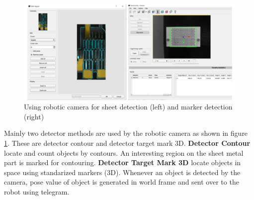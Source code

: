 \begin{figure}[h]
    \centering
    \includegraphics[width=\textwidth]{figures/robotic-detection.png}
    \caption{Using robotic camera for sheet detection (left) and marker detection (right)}
    \label{fig:robotic-detection}
\end{figure}

Mainly two detector methods are used by the robotic camera as shown in figure \ref{fig:robotic-detection}. These are detector contour and detector target mark 3D. \textbf{Detector Contour} locate and count objects by contours. An interesting region on the sheet metal part is marked for contouring. 
\textbf{Detector Target Mark 3D} locate objects in space using standarized markers (3D).
Whenever an object is detected by the camera, pose value of object is generated in world frame and sent over to the robot using telegram.
